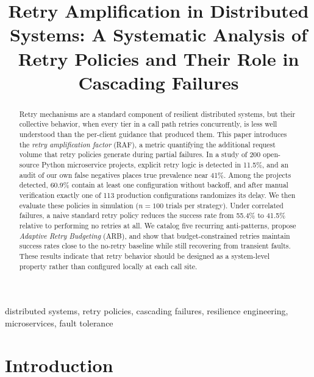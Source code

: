 \documentclass[conference]{IEEEtran}
\begin{document}
\title{Retry Amplification in Distributed Systems: A Systematic Analysis of Retry Policies and Their Role in Cascading Failures}

\author{
\and
{}
}

\maketitle

\begin{abstract}
Retry mechanisms are a standard component of resilient distributed systems, but their collective behavior, when every tier in a call path retries concurrently, is less well understood than the per-client guidance that produced them. This paper introduces the \textit{retry amplification factor} (RAF), a metric quantifying the additional request volume that retry policies generate during partial failures. In a study of 200 open-source Python microservice projects, explicit retry logic is detected in 11.5\%, and an audit of our own false negatives places true prevalence near 41\%. Among the projects detected, 60.9\% contain at least one configuration without backoff, and after manual verification exactly one of 113 production configurations randomizes its delay. We then evaluate these policies in simulation ($n=100$ trials per strategy). Under correlated failures, a naive standard retry policy reduces the success rate from 55.4\% to 41.5\% relative to performing no retries at all. We catalog five recurring anti-patterns, propose \textit{Adaptive Retry Budgeting} (ARB), and show that budget-constrained retries maintain success rates close to the no-retry baseline while still recovering from transient faults. These results indicate that retry behavior should be designed as a system-level property rather than configured locally at each call site.
\end{abstract}

\begin{IEEEkeywords}
distributed systems, retry policies, cascading failures, resilience engineering, microservices, fault tolerance
\end{IEEEkeywords}

\section{Introduction}
\end{document}

